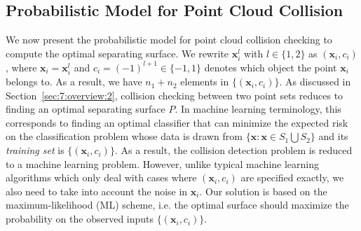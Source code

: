 \subsection{Probabilistic Model for Point Cloud Collision}
We now present the probabilistic model for point cloud collision checking to compute the optimal separating surface. We rewrite $\mathbf x_i^l$ with $l\in \{1,2\}$ as $(\mathbf x_i, c_i)$, where $\mathbf x_i = \mathbf x_i^l$ and $c_i = (-1)^{l+1} \in \{-1, 1\}$ denotes which object the point $\mathbf x_i$ belongs to.
As a result, we have $n_1 + n_2$ elements in $\{(\mathbf x_i, c_i)\}$. As discussed in Section~\ref{sec:7:overview:2}, collision checking between two point sets reduces
to finding an optimal separating surface $P$. In machine learning terminology, this corresponds to finding an optimal classifier that can minimize the expected risk on the classification problem whose data is drawn
from $\{ \mathbf x: \mathbf x \in S_1 \bigcup S_2\}$ and its {\em training set} is $\{(\mathbf x_i, c_i)\}$. As a result, the collision detection problem is reduced to a
machine learning problem. However, unlike typical machine learning algorithms which only deal with cases where $(\mathbf x_i, c_i)$ are specified exactly, we also need to take into account the noise in $\mathbf x_i$. Our solution is based on the maximum-likelihood (ML) scheme, i.e. the optimal surface should maximize the probability on the observed inputs $\{(\mathbf x_i, c_i)\}$.

